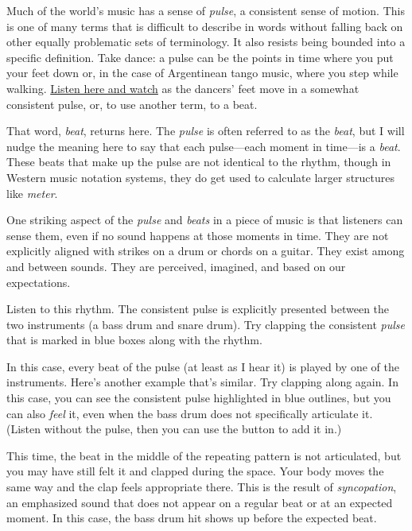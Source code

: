 \documentclass[twoside]{article}
\begin{document}
Much of the world's music has a sense of \emph{pulse}, a consistent
sense of motion. This is one of many terms that is difficult to describe
in words without falling back on other equally problematic sets of
terminology. It also resists being bounded into a specific definition.
Take dance: a pulse can be the points in time where you put your feet
down or, in the case of Argentinean tango music, where you step while
walking. \href{https://www.youtube.com/embed/wIvfPI_GT3U}{Listen here
and watch} as the dancers' feet move in a somewhat consistent pulse, or,
to use another term, to a beat.

That word, \emph{beat}, returns here. The \emph{pulse} is often referred
to as the \emph{beat}, but I will nudge the meaning here to say that
each pulse---each moment in time---is a \emph{beat}. These beats that
make up the pulse are not identical to the rhythm, though in Western
music notation systems, they do get used to calculate larger structures
like \emph{meter}.

One striking aspect of the \emph{pulse} and \emph{beats} in a piece of
music is that listeners can sense them, even if no sound happens at
those moments in time. They are not explicitly aligned with strikes on a
drum or chords on a guitar. They exist among and between sounds. They
are perceived, imagined, and based on our expectations.

Listen to this rhythm. The consistent pulse is explicitly presented
between the two instruments (a bass drum and snare drum). Try clapping
the consistent \emph{pulse} that is marked in blue boxes along with the
rhythm.

\hypertarget{example9}{}

In this case, every beat of the pulse (at least as I hear it) is played
by one of the instruments. Here's another example that's similar. Try
clapping along again. In this case, you can see the consistent pulse
highlighted in blue outlines, but you can also \emph{feel} it, even when
the bass drum does not specifically articulate it. (Listen without the
pulse, then you can use the button to add it in.)

\hypertarget{example10}{}

This time, the beat in the middle of the repeating pattern is not
articulated, but you may have still felt it and clapped during the
space. Your body moves the same way and the clap feels appropriate
there. This is the result of \emph{syncopation}, an emphasized sound
that does not appear on a regular beat or at an expected moment. In this
case, the bass drum hit shows up before the expected beat.
\end{document}
